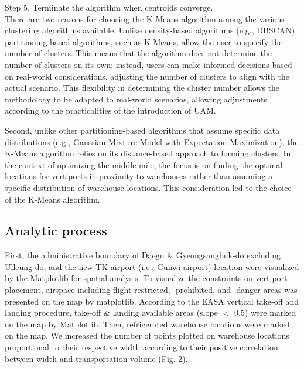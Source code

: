 \documentclass[11pt]{article}
\begin{document}
    Step 5. Terminate the algorithm when centroids converge.\\

    There are two reasons for choosing the K-Means algorithm among the various clustering algorithms available. Unlike density-based algorithms (e.g., DBSCAN), partitioning-based algorithms, such as K-Means, allow the user to specify the number of clusters. This means that the algorithm does not determine the number of clusters on its own; instead, users can make informed decisions based on real-world considerations, adjusting the number of clusters to align with the actual scenario. This flexibility in determining the cluster number allows the methodology to be adapted to real-world scenarios, allowing adjustments according to the practicalities of the introduction of UAM.
    
    Second, unlike other partitioning-based algorithms that assume specific data distributions (e.g., Gaussian Mixture Model with Expectation-Maximization), the K-Means algorithm relies on its distance-based approach to forming clusters. In the context of optimizing the middle mile, the focus is on finding the optimal locations for vertiports in proximity to warehouses rather than assuming a specific distribution of warehouse locations. This consideration led to the choice of the K-Means algorithm.


    \subsection{Analytic process}
    
    First, the administrative boundary of Daegu \& Gyeongsangbuk-do excluding Ulleung-do, and the new TK airport (i.e., Gunwi airport) location were visualized by the Matplotlib for spatial analysis. To visualize the constraints on vertiport placement, airspace including flight-restricted, -prohibited, and -danger areas was presented on the map by matplotlib. According to the EASA vertical take-off and landing procedure, take-off \& landing available areas (slope ${<}$ 0.5)  were marked on the map by Matplotlib. Then, refrigerated warehouse locations were marked on the map. We increased the number of points plotted on warehouse locations proportional to their respective width according to their positive correlation between width and transportation volume (Fig. 2).
\end{document}
